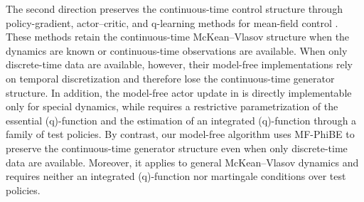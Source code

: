 \documentclass[a4paper, 10pt, english, reqno]{amsart}
\begin{document}
The second direction preserves the continuous-time control structure through policy-gradient, actor--critic, and q-learning methods for mean-field control \cite{frikhaActorCritic,Wei2023ContinuousTQ}. These methods retain the continuous-time McKean--Vlasov structure when the dynamics are known or continuous-time observations are available. When only discrete-time data are available, however, their model-free implementations rely on temporal discretization and therefore lose the continuous-time generator structure. In addition, the model-free actor update in \cite{frikhaActorCritic} is directly implementable only for special dynamics, while \cite{Wei2023ContinuousTQ} requires a restrictive parametrization of the essential (q)-function and the estimation of an integrated (q)-function through a family of test policies. By contrast, our model-free algorithm uses MF-PhiBE to preserve the continuous-time generator structure even when only discrete-time data are available. Moreover, it applies to general McKean--Vlasov dynamics and requires neither an integrated (q)-function nor martingale conditions over test policies.
\end{document}
